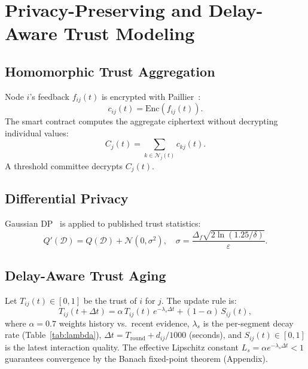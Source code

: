 \documentclass[journal,twoside,10pt]{IEEEtran}
\begin{document}
\section{Privacy-Preserving and Delay-Aware Trust Modeling}
\label{sec:trust}

\subsection{Homomorphic Trust Aggregation}

Node $i$'s feedback $f_{ij}(t)$ is encrypted with
Paillier~\cite{paillier1999}:
\begin{equation}
  c_{ij}(t) = \mathrm{Enc}\!\left(f_{ij}(t)\right). \label{eq:enc}
\end{equation}
The smart contract computes the aggregate ciphertext without
decrypting individual values:
\begin{equation}
  C_j(t) = \textstyle\sum_{k \in \mathcal{N}_j(t)} c_{kj}(t). \label{eq:agg}
\end{equation}
A threshold committee decrypts $C_j(t)$.

\subsection{Differential Privacy}

Gaussian DP~\cite{dwork2014} is applied to published trust statistics:
\begin{equation}
  Q'(\mathcal{D}) = Q(\mathcal{D}) + \mathcal{N}(0,\sigma^2),\quad
  \sigma = \frac{\Delta_f\sqrt{2\ln(1.25/\delta)}}{\varepsilon}.
  \label{eq:dp}
\end{equation}

\subsection{Delay-Aware Trust Aging}
\label{sec:aging}

Let $T_{ij}(t)\!\in\![0,1]$ be the trust of $i$ for $j$.
The update rule is:
\begin{equation}
  T_{ij}(t\!+\!\Delta t) =
    \alpha\,T_{ij}(t)\,e^{-\lambda_s \Delta t}
    + (1\!-\!\alpha)\,S_{ij}(t),
  \label{eq:aging}
\end{equation}
where $\alpha\!=\!0.7$ weights history vs.\ recent evidence,
$\lambda_s$ is the per-segment decay rate (Table~\ref{tab:lambda}),
$\Delta t = T_{\mathrm{round}} + d_{ij}/1000$ (seconds), and
$S_{ij}(t)\!\in\![0,1]$ is the latest interaction quality.
The effective Lipschitz constant $L_s = \alpha e^{-\lambda_s \Delta t}<1$
guarantees convergence by the Banach fixed-point theorem (Appendix).
\end{document}
